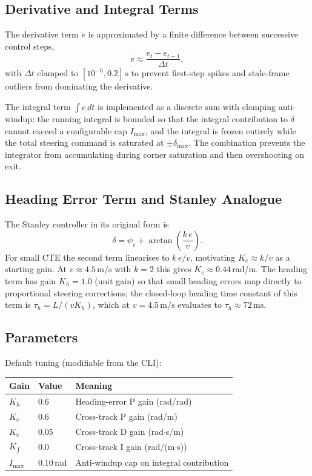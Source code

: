 \documentclass[11pt]{article}
\begin{document}
\subsection{Derivative and Integral Terms}

The derivative term $\dot e$ is approximated by a finite difference between
successive control steps,
\[
\dot e \approx \frac{e_t - e_{t-1}}{\Delta t},
\]
with $\Delta t$ clamped to $[10^{-6}, 0.2]\,\text{s}$ to prevent first-step
spikes and stale-frame outliers from dominating the derivative.

The integral term $\int e\, dt$ is implemented as a discrete sum with
clamping anti-windup: the running integral is bounded so that the
integral contribution to $\delta$ cannot exceed a configurable cap
$I_{\max}$, and the integral is frozen entirely while the total steering
command is saturated at $\pm\delta_{\max}$.  The combination prevents the
integrator from accumulating during corner saturation and then overshooting
on exit.

\subsection{Heading Error Term and Stanley Analogue}

The Stanley controller in its original form is
\[
\delta = \psi_e + \arctan\!\left(\frac{k\, e}{v}\right).
\]
For small CTE the second term linearises to $k\,e/v$, motivating
$K_e \approx k/v$ as a starting gain.  At $v \approx 4.5\,\text{m/s}$ with
$k = 2$ this gives $K_e \approx 0.44$\,rad/m.  The heading term has gain
$K_h = 1.0$ (unit gain) so that small heading errors map directly to
proportional steering corrections; the closed-loop heading time constant of
this term is $\tau_h = L / (v K_h)$, which at $v = 4.5\,\text{m/s}$ evaluates
to $\tau_h \approx 72\,\text{ms}$.

\subsection{Parameters}

Default tuning (modifiable from the CLI):

\medskip
\begin{center}
\begin{tabular}{lll}
\toprule
Gain & Value & Meaning \\
\midrule
$K_h$        & 0.6  & Heading-error P gain (rad/rad) \\
$K_e$        & 0.6  & Cross-track P gain (rad/m) \\
$K_{\dot e}$ & 0.05 & Cross-track D gain (rad$\cdot$s/m) \\
$K_{\int}$   & 0.0  & Cross-track I gain (rad/(m$\cdot$s)) \\
$I_{\max}$   & 0.10\,rad & Anti-windup cap on integral contribution \\
\bottomrule
\end{tabular}
\end{center}
\end{document}
